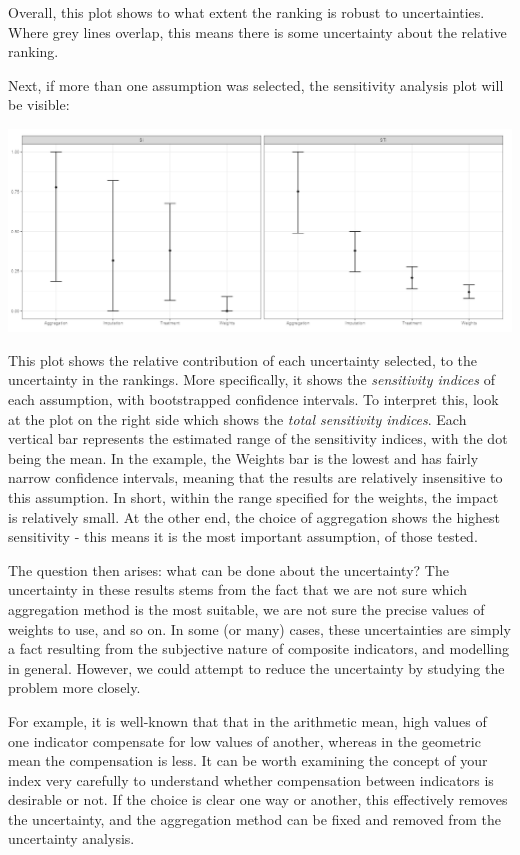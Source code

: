 \documentclass[
  letterpaper,
  DIV=11,
  numbers=noendperiod]{scrreprt}
\begin{document}
Overall, this plot shows to what extent the ranking is robust to
uncertainties. Where grey lines overlap, this means there is some
uncertainty about the relative ranking.

Next, if more than one assumption was selected, the sensitivity analysis
plot will be visible:

\includegraphics[width=1\textwidth,height=\textheight]{figs/sensitivity_2.png}

This plot shows the relative contribution of each uncertainty selected,
to the uncertainty in the rankings. More specifically, it shows the
\emph{sensitivity indices} of each assumption, with bootstrapped
confidence intervals. To interpret this, look at the plot on the right
side which shows the \emph{total sensitivity indices}. Each vertical bar
represents the estimated range of the sensitivity indices, with the dot
being the mean. In the example, the Weights bar is the lowest and has
fairly narrow confidence intervals, meaning that the results are
relatively insensitive to this assumption. In short, within the range
specified for the weights, the impact is relatively small. At the other
end, the choice of aggregation shows the highest sensitivity - this
means it is the most important assumption, of those tested.

The question then arises: what can be done about the uncertainty? The
uncertainty in these results stems from the fact that we are not sure
which aggregation method is the most suitable, we are not sure the
precise values of weights to use, and so on. In some (or many) cases,
these uncertainties are simply a fact resulting from the subjective
nature of composite indicators, and modelling in general. However, we
could attempt to reduce the uncertainty by studying the problem more
closely.

For example, it is well-known that that in the arithmetic mean, high
values of one indicator compensate for low values of another, whereas in
the geometric mean the compensation is less. It can be worth examining
the concept of your index very carefully to understand whether
compensation between indicators is desirable or not. If the choice is
clear one way or another, this effectively removes the uncertainty, and
the aggregation method can be fixed and removed from the uncertainty
analysis.
\end{document}
